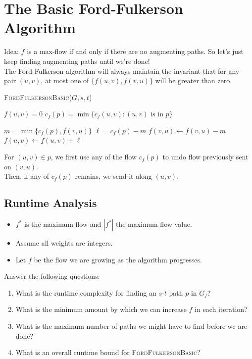 \documentclass[11  pt]{article}
\begin{document}
	
	\newpage
	\section{The Basic Ford-Fulkerson Algorithm}
	Idea: $f$ is a max-flow if and only if there are no augmenting paths. So let's just keep finding augmenting paths until we're done! \\
	
	The Ford-Fulkerson algorithm will always maintain the invariant that for any pair $(u,v)$, at most one of $\{f(u,v), f(v,u)\}$ will be greater than zero. \\
	
	\begin{algorithm}
		\textsc{FordFulkersonBasic}($G,s,t$)
		\begin{algorithmic}
			\State $f(u,v) = 0$
			\EndFor
			\State $c_f(p) = \min \{c_f(u,v) \colon (u,v) \text{ is in } p\}$
			
			\State $m = \min \{c_f(p), f(v,u)\}$ %
			\State $\ell = c_f(p) - m$ %
			\State $f(v,u) \leftarrow f(v,u) - m$
			\State $f(u,v) \leftarrow f(u,v) + \ell$
			\EndFor
			\EndWhile
		\end{algorithmic}
	\end{algorithm}
	For $(u,v) \in p$, we first use any of the flow $c_f(p)$ to undo flow previously sent on $(v,u)$.\\
	
	Then, if any of $c_f(p)$ remains, we send it along $(u,v)$.
	
	\newpage
	\subsection{Runtime Analysis}
	\begin{itemize}
		\item $f^*$ is the maximum flow and $|f^*|$ the maximum flow value.
		\item Assume all weights are integers.
		\item Let $f$ be the flow we are growing as the algorithm progresses.
	\end{itemize}
	
	Answer the following questions:
	\begin{enumerate}
		\item What is the runtime complexity for finding an $s$-$t$ path $p$ in $G_f$?
		\item What is the minimum amount by which we can increase $f$ in each iteration?
		\item What is the maximum number of paths we might have to find before we are done?
		\item What is an overall runtime bound for \textsc{FordFulkersonBasic}?
	\end{enumerate}
\end{document}
